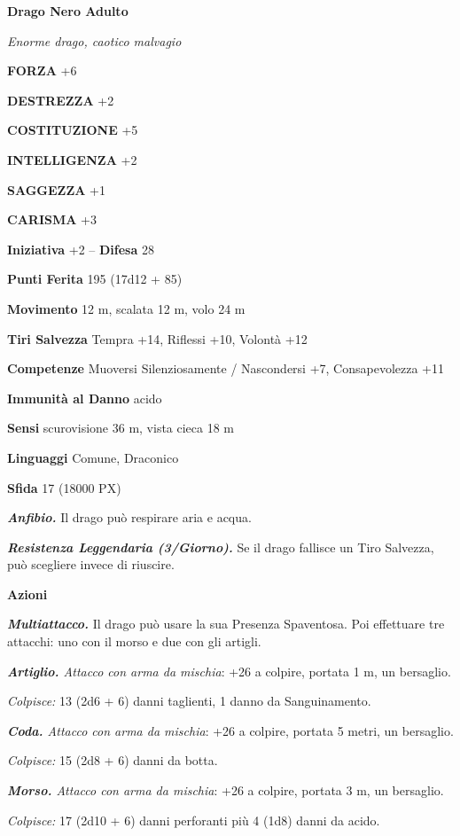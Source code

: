 \begin{multicols}{2}
	\medskip{}\textbf{Drago Nero Adulto}

	\textit{Enorme drago, caotico malvagio}

	\textbf{FORZA} +6

	\textbf{DESTREZZA} +2

	\textbf{COSTITUZIONE} +5

	\textbf{INTELLIGENZA} +2

	\textbf{SAGGEZZA} +1

	\textbf{CARISMA} +3

	\textbf{Iniziativa} +2 -- \textbf{Difesa} 28

	\textbf{Punti Ferita} 195 (17d12 + 85)

	\textbf{Movimento} 12 m, scalata 12 m, volo 24 m

	\textbf{Tiri Salvezza} Tempra +14, Riflessi +10, Volontà +12

	\textbf{Competenze} Muoversi Silenziosamente / Nascondersi +7, Consapevolezza +11

	\textbf{Immunità al Danno} acido

	\textbf{Sensi} scurovisione 36 m, vista cieca 18 m

	\textbf{Linguaggi} Comune, Draconico

	\textbf{Sfida} 17 (18000 PX)

	\textit{\textbf{Anfibio.}} Il drago può respirare aria e acqua.

	\textit{\textbf{Resistenza Leggendaria (3/Giorno).}} Se il drago fallisce un Tiro Salvezza, può scegliere invece di riuscire.

	\textbf{Azioni}

	\textit{\textbf{Multiattacco.}} Il drago può usare la sua Presenza Spaventosa. Poi effettuare tre attacchi: uno con il morso e due con gli artigli.

	\textit{\textbf{Artiglio.} Attacco con arma da mischia}: +26 a colpire, portata 1 m, un bersaglio.

	\textit{Colpisce:} 13 (2d6 + 6) danni taglienti, 1 danno da Sanguinamento.

	\textit{\textbf{Coda.} Attacco con arma da mischia}: +26 a colpire, portata 5 metri, un bersaglio.

	\textit{Colpisce:} 15 (2d8 + 6) danni da botta.

	\textit{\textbf{Morso.} Attacco con arma da mischia}: +26 a colpire, portata 3 m, un bersaglio.

	\textit{Colpisce:} 17 (2d10 + 6) danni perforanti più 4 (1d8) danni da acido.


\end{multicols}
